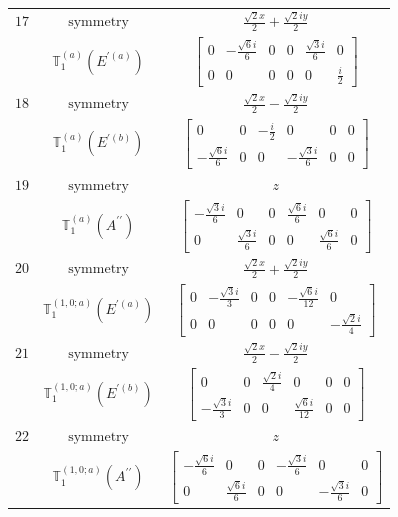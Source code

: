 \documentclass[fleqn,8pt,landscape]{jsarticle}
\begin{document}
\begin{longtable}{ccc}
$ 17 $ & $ \text{symmetry} $ & $ \frac{\sqrt{2} x}{2} + \frac{\sqrt{2} i y}{2} $ \\
$  $ & $ \mathbb{T}_{1}^{(a)}(E^{\prime(a)}) $ & $ \begin{bmatrix} 0 & - \frac{\sqrt{6} i}{6} & 0 & 0 & \frac{\sqrt{3} i}{6} & 0 \\ 0 & 0 & 0 & 0 & 0 & \frac{i}{2} \end{bmatrix} $ \\ \hline
$ 18 $ & $ \text{symmetry} $ & $ \frac{\sqrt{2} x}{2} - \frac{\sqrt{2} i y}{2} $ \\
$  $ & $ \mathbb{T}_{1}^{(a)}(E^{\prime(b)}) $ & $ \begin{bmatrix} 0 & 0 & - \frac{i}{2} & 0 & 0 & 0 \\ - \frac{\sqrt{6} i}{6} & 0 & 0 & - \frac{\sqrt{3} i}{6} & 0 & 0 \end{bmatrix} $ \\ \hline
$ 19 $ & $ \text{symmetry} $ & $ z $ \\
$  $ & $ \mathbb{T}_{1}^{(a)}(A^{\prime\prime}) $ & $ \begin{bmatrix} - \frac{\sqrt{3} i}{6} & 0 & 0 & \frac{\sqrt{6} i}{6} & 0 & 0 \\ 0 & \frac{\sqrt{3} i}{6} & 0 & 0 & \frac{\sqrt{6} i}{6} & 0 \end{bmatrix} $ \\ \hline
$ 20 $ & $ \text{symmetry} $ & $ \frac{\sqrt{2} x}{2} + \frac{\sqrt{2} i y}{2} $ \\
$  $ & $ \mathbb{T}_{1}^{(1,0;a)}(E^{\prime(a)}) $ & $ \begin{bmatrix} 0 & - \frac{\sqrt{3} i}{3} & 0 & 0 & - \frac{\sqrt{6} i}{12} & 0 \\ 0 & 0 & 0 & 0 & 0 & - \frac{\sqrt{2} i}{4} \end{bmatrix} $ \\ \hline
$ 21 $ & $ \text{symmetry} $ & $ \frac{\sqrt{2} x}{2} - \frac{\sqrt{2} i y}{2} $ \\
$  $ & $ \mathbb{T}_{1}^{(1,0;a)}(E^{\prime(b)}) $ & $ \begin{bmatrix} 0 & 0 & \frac{\sqrt{2} i}{4} & 0 & 0 & 0 \\ - \frac{\sqrt{3} i}{3} & 0 & 0 & \frac{\sqrt{6} i}{12} & 0 & 0 \end{bmatrix} $ \\ \hline
$ 22 $ & $ \text{symmetry} $ & $ z $ \\
$  $ & $ \mathbb{T}_{1}^{(1,0;a)}(A^{\prime\prime}) $ & $ \begin{bmatrix} - \frac{\sqrt{6} i}{6} & 0 & 0 & - \frac{\sqrt{3} i}{6} & 0 & 0 \\ 0 & \frac{\sqrt{6} i}{6} & 0 & 0 & - \frac{\sqrt{3} i}{6} & 0 \end{bmatrix} $ \\ \hline

\end{longtable}
\end{document}
